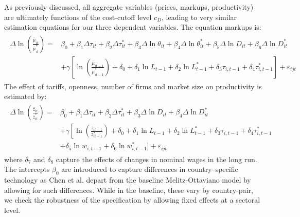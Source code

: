As previously discussed, all aggregate variables (prices, markups, productivity) are ultimately functions of the cost-cutoff level $c_D$, leading to very similar estimation equations for our three dependent variables. The equation markups is:
\begin{align}
\begin{split}\label{eq:gw-estimation-markup}
\Delta \ln \left( \frac{\bar{\mu}_{it}}{\bar{\mu}_{it}^*} \right) = &\beta_0 + \beta_1 \Delta \tau_{it} + \beta_2 \Delta \tau_{it}^* + \beta_3 \Delta \ln \theta_{it} + \beta_4 \Delta \ln \theta_{it}^* + \beta_5 \Delta \ln D_{it} + \beta_6 \Delta \ln D_{it}^*\\ 
&+ \gamma \left[ \ln \left( \frac{\bar{\mu}_{it-1}}{\bar{\mu}_{it-1}^*} \right) + \delta_0 + \delta_1 \ln L_{t-1} + \delta_2\ln L_{t-1}^* + \delta_3  \tau_{i,t-1} + \delta_4  \tau_{i,t-1}^* \right] + \varepsilon_{ijt} 
\end{split}
\end{align}
The effect of tariffs, openness, number of firms and market size on productivity is estimated by:
\begin{align}
\begin{split}\label{eq:gw-estimation-productivity}
\Delta \ln \left( \frac{\bar{z}_{it}}{\bar{z}_{it}^*} \right) =&\beta_0 + \beta_1 \Delta \tau_{it} + \beta_2 \Delta \tau_{it}^*  + \beta_3 \Delta \ln D_{it} + \beta_4 \Delta \ln D_{it}^*\\
&+ \gamma \left[ \ln \left( \frac{z_{it-1}}{z_{it-1}^*} \right) + \delta_0 + \delta_1 \ln L_{t-1} + \delta_2\ln L_{t-1}^* + \delta_3  \tau_{i,t-1} + \delta_4  \tau_{i,t-1}^*  \right. \\ 
&+ \left. \delta_5 \ln w_{i,t-1} +  \delta_6 \ln w_{i,t-1}^* \bigg] \right. + \varepsilon_{ijt} 
\end{split}
\end{align}
where $\delta_7$ and $\delta_8$ capture the effects of changes in nominal wages in the long run. The intercepts $\beta_0$ are introduced to capture differences in country--specific technology as Chen et al. depart from the baseline Melitz-Ottaviano model by allowing for such differences. While in the baseline, these vary by country-pair, we check the robustness of the specification by allowing fixed effects at a sectoral level. 

